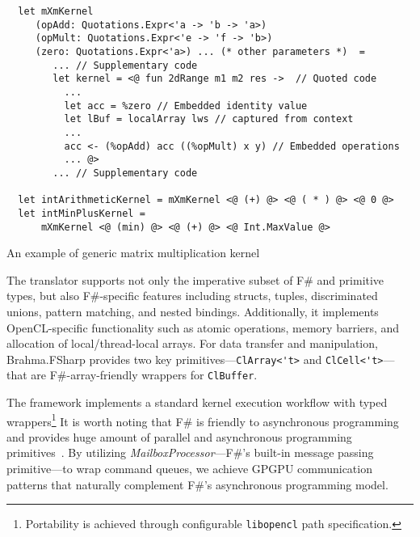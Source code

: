 \begin{listing}
    \begin{verbatim}
  let mXmKernel    
     (opAdd: Quotations.Expr<'a -> 'b -> 'a>) 
     (opMult: Quotations.Expr<'e -> 'f -> 'b>) 
     (zero: Quotations.Expr<'a>) ... (* other parameters *)  =
        ... // Supplementary code
        let kernel = <@ fun 2dRange m1 m2 res ->  // Quoted code
          ... 
          let acc = %zero // Embedded identity value
          let lBuf = localArray lws // captured from context
          ... 
          acc <- (%opAdd) acc ((%opMult) x y) // Embedded operations
          ... @>
        ... // Supplementary code
    
  let intArithmeticKernel = mXmKernel <@ (+) @> <@ ( * ) @> <@ 0 @>
  let intMinPlusKernel = 
      mXmKernel <@ (min) @> <@ (+) @> <@ Int.MaxValue @>
    \end{verbatim}
    \caption{An example of generic matrix multiplication kernel}
    \label{lst:mXm_kernels}
  \end{listing}

The translator supports not only the imperative subset of F\# and primitive types, but also F\#-specific features including structs, tuples, discriminated unions, pattern matching, and nested bindings.
Additionally, it implements OpenCL-specific functionality such as atomic operations, memory barriers, and allocation of local/thread-local arrays.
For data transfer and manipulation, Brahma.FSharp provides two key primitives---\verb|ClArray<'t>| and \verb|ClCell<'t>|--- that are F\#-array-friendly wrappers for \texttt{ClBuffer}.

The framework implements a standard kernel execution workflow with typed wrappers\footnote{Portability is achieved through configurable \texttt{libopencl} path specification.}
It is worth noting that F\# is friendly to asynchronous programming and provides huge amount of parallel and asynchronous programming primitives~\cite{FSharpAsync}.
By utilizing \emph{MailboxProcessor}---F\#'s built-in message passing primitive---to wrap command queues, we achieve GPGPU communication patterns that naturally complement F\#'s asynchronous programming model.